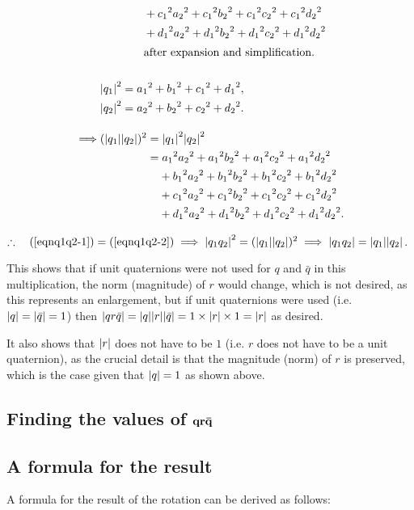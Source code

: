 \documentclass[12pt]{article}
\theoremstyle{definition}
\begin{document}
\begin{alignat}{2}
             & \phantom{\abs{q_1q_2}^2=} + {c_1}^2{a_2}^2 + {c_1}^2{b_2}^2 + {c_1}^2{c_2}^2 + {c_1}^2{d_2}^2 \nonumber \\
             & \phantom{\abs{q_1q_2}^2=} + {d_1}^2{a_2}^2 + {d_1}^2{b_2}^2 + {d_1}^2{c_2}^2 + {d_1}^2{d_2}^2 \nonumber \\
             & \phantom{\abs{q_1q_2}^2=} \text{after expansion and simplification.} \\[15pt]
    & \abs{q_1}^2 = {a_1}^2 + {b_1}^2 + {c_1}^2 + {d_1}^2, \\
    & \abs{q_2}^2 = {a_2}^2 + {b_2}^2 + {c_2}^2 + {d_2}^2. \nonumber \\[10pt]
    \implies & (\abs{q_1}\abs{q_2})^2 = \abs{q_1}^2\abs{q_2}^2 \nonumber \\
             & \phantom{(\abs{q_1}\abs{q_2})^2} = {a_1}^2{a_2}^2 + {a_1}^2{b_2}^2 + {a_1}^2{c_2}^2 + {a_1}^2{d_2}^2 \label{eqnq1q2-2} \\
             & \phantom{(\abs{q_1}\abs{q_2})^2=} + {b_1}^2{a_2}^2 + {b_1}^2{b_2}^2 + {b_1}^2{c_2}^2 + {b_1}^2{d_2}^2 \nonumber \\
             & \phantom{(\abs{q_1}\abs{q_2})^2=} + {c_1}^2{a_2}^2 + {c_1}^2{b_2}^2 + {c_1}^2{c_2}^2 + {c_1}^2{d_2}^2 \nonumber \\
             & \phantom{(\abs{q_1}\abs{q_2})^2=} + {d_1}^2{a_2}^2 + {d_1}^2{b_2}^2 + {d_1}^2{c_2}^2 + {d_1}^2{d_2}^2. \nonumber
\end{alignat}

$\therefore \quad (\ref{eqnq1q2-1}) = (\ref{eqnq1q2-2}) \implies \abs{q_1q_2}^2 = (\abs{q_1}\abs{q_2})^2 \implies \abs{q_1q_2} = \abs{q_1}\abs{q_2}$.

This shows that if unit quaternions were not used for $q$ and $\bar{q}$ in this multiplication, the norm (magnitude) of $r$ would change, which is not desired, as this represents an enlargement, but if unit quaternions were used (i.e. $\abs{q} = \abs{\bar{q}} = 1$) then $\abs{qr\bar{q}} = \abs{q}\abs{r}\abs{\bar{q}} = 1\times\abs{r}\times1 = \abs{r}$ as desired.

It also shows that $\abs{r}$ does not have to be $1$ (i.e. $r$ does not have to be a unit quaternion), as the crucial detail is that the magnitude (norm) of $r$ is preserved, which is the case given that $\abs{q} = 1$ as shown above.

\subsection{Finding the values of $\vb{qr\bar{q}}$}

\subsection{A formula for the result}

A formula for the result of the rotation can be derived as follows:



\pagebreak

\printbibliography
\end{document}
